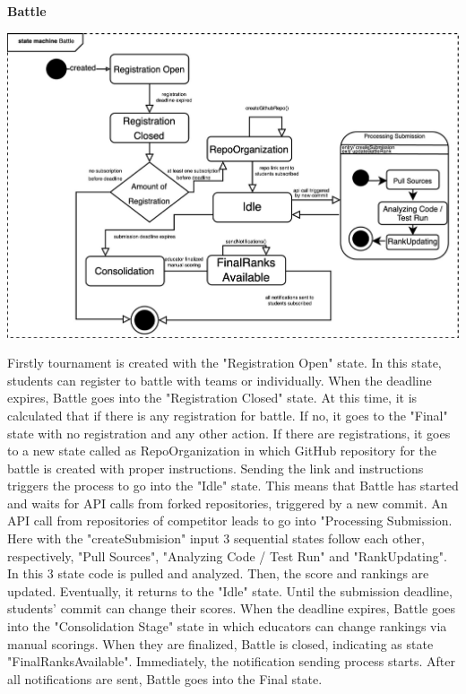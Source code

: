 \textbf{Battle}\newline
\begin{center}
    \includegraphics[scale=0.2]{Images/battleStatechart.jpeg}
\end{center}
Firstly tournament is created with the "Registration Open" state. In this state, students can register to battle with teams or individually. When the deadline expires, Battle goes into the "Registration Closed" state. At this time, it is calculated that if there is any registration for battle. If no, it goes to the "Final" state with no registration and any other action. If there are registrations, it goes to a new state called as RepoOrganization in which GitHub repository for the battle is created with proper instructions. Sending the link and instructions triggers the process to go into the "Idle" state. This means that Battle has started and waits for API calls from forked repositories, triggered by a new commit. An API call from repositories of competitor leads to go into "Processing Submission. Here with the "createSubmision" input 3 sequential states follow each other, respectively, "Pull Sources", "Analyzing Code / Test Run" and "RankUpdating". In this 3 state code is pulled and analyzed. Then, the score and rankings are updated.  Eventually, it returns to the "Idle" state. Until the submission deadline, students' commit can change their scores. When the deadline expires, Battle goes into the "Consolidation Stage" state in which educators can change rankings via manual scorings. When they are finalized, Battle is closed, indicating as state "FinalRanksAvailable". Immediately, the notification sending process starts. After all notifications are sent, Battle goes into the Final state.
\newpage



